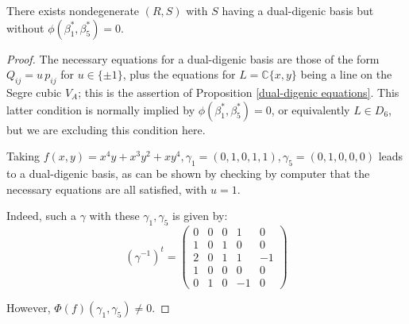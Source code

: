 \documentclass{report}
\begin{document}
\begin{lemma}
There exists nondegenerate $(R,S)$ with $S$ having a dual-digenic basis but without $\phi(\beta_1^*,\beta_5^*) = 0$.
\end{lemma}
\begin{proof}
The necessary equations for a dual-digenic basis are those of the form $Q_{ij} = u \, p_{ij}$ for $u \in \{ \pm 1 \}$, plus the equations for $L = \mathbb{C}\{x,y\}$ being a line on the Segre cubic $V_A$; this is the assertion of Proposition \ref{dual-digenic equations}.  This latter condition is normally implied by $\phi(\beta_1^*,\beta_5^*) = 0$, or equivalently $L \in D_6$, but we are excluding this condition here.

Taking $f(x,y) = x^4 y + x^3 y^2 + xy^4, \gamma_1 = (0,1,0,1,1), \gamma_5 = (0,1,0,0,0)$ leads to a dual-digenic basis, as can be shown by checking by computer that the necessary equations are all satisfied, with $u = 1$.

Indeed, such a $\gamma$ with these $\gamma_1, \gamma_5$ is given by:
\begin{equation}
(\gamma^{-1})^t =
\begin{pmatrix}
0 & 0 & 0 & 1 & 0 \\
1 & 0 & 1 & 0 & 0 \\
2 & 0 & 1 & 1 & -1 \\
1 & 0 & 0 & 0 & 0 \\
0 & 1 & 0 & -1 & 0
\end{pmatrix}
\end{equation}

However, $\Phi(f)(\gamma_1,\gamma_5) \neq 0$.
\end{proof}
\end{document}
